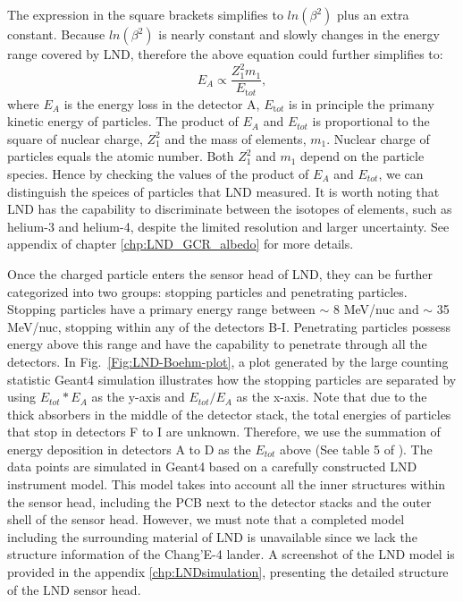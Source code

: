The expression in the square brackets simplifies to $ln(\beta^2)$ plus an extra constant. Because $ln(\beta^2)$ is nearly constant and slowly changes in the energy range covered by \ac{LND}, therefore the above equation could further simplifies to:
\begin{equation}
    E_A \propto \frac{Z_1^2 m_1}{E_{\mathrm tot}},
    \label{eq:BB2}
\end{equation}
where $E_A$ is the energy loss in the detector A, $E_{\mathrm tot}$ is in principle the primany kinetic energy of particles.
The product of $E_A$ and $E_{tot}$ is proportional to the square of nuclear charge, $Z_1^2$ and the mass of elements, $m_1$. Nuclear charge of particles equals the atomic number. Both $Z_1^2$ and $m_1$ depend on the particle species. Hence by checking the values of the product of $E_A$ and $E_{tot}$, we can distinguish the speices of particles that \ac{LND} measured. It is worth noting that \ac{LND} has the capability to discriminate between the isotopes of elements, such as helium-3 and helium-4, despite the limited resolution and larger uncertainty. See appendix of chapter \ref{chp:LND_GCR_albedo} for more details.



Once the charged particle enters the sensor head of \ac{LND}, they can be further categorized into two groups: stopping particles and penetrating particles. Stopping particles have a primary energy range between $\sim$ 8 MeV/nuc and $\sim$ 35 MeV/nuc, stopping within any of the detectors B-I. Penetrating particles possess energy above this range and have the capability to penetrate through all the detectors. In Fig.~\ref{Fig:LND-Boehm-plot}, a plot generated by the large counting statistic \ac{Geant4} \citep{Agostinelli-2003} simulation illustrates how the stopping particles are separated by using $E_{tot} * E_A$ as the y-axis and $E_{tot} / E_A$ as the x-axis. 
Note that due to the thick absorbers in the middle of the detector stack, the total energies of particles that stop in detectors F to I are unknown. Therefore, we use the summation of energy deposition in detectors A to D as the $E_{tot}$ above (See table 5 of \citet{Wimmer2020SSRv}).
The data points are simulated in \ac{Geant4} based on a carefully constructed \ac{LND} instrument model. This model takes into account all the inner structures within the sensor head, including the \ac{PCB} next to the detector stacks and the outer shell of the sensor head. However, we must note that a completed model including the surrounding material of \ac{LND} is unavailable since we lack the structure information of the Chang'E-4 lander.
A screenshot of the \ac{LND} model is provided in the appendix \ref{chp:LNDsimulation}, presenting the detailed structure of the \ac{LND} sensor head.

